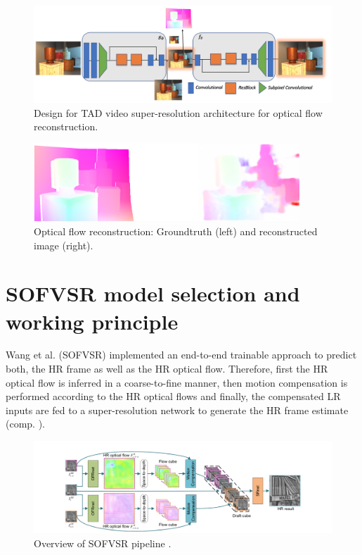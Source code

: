 \begin{figure}[!ht]
	\centering
	\includegraphics[width=14cm]{figures/architecture_video_flow}
	\caption{Design for \ac{TAD} video super-resolution architecture for optical flow reconstruction. }
  \label{fig:architecture_video_flow}
\end{figure}

\begin{figure}[!ht]
	\centering
	\includegraphics[width=10cm]{figures/flow}
	\caption{Optical flow reconstruction: Groundtruth (left) and reconstructed
  image (right).}
  \label{fig:flow}
\end{figure}

\section*{SOFVSR model selection and working principle}
Wang et al. \cite{LFVSRTHROFE} (SOFVSR) implemented an end-to-end trainable approach to predict both, the \ac{HR} frame as well as the HR optical flow. Therefore, first the HR optical flow is inferred in a coarse-to-fine manner, then motion compensation is performed according to the HR optical flows and finally, the compensated LR inputs are fed to a super-resolution network to generate the HR frame estimate (comp. ).

\begin{figure}[!ht]
	\centering
	\includegraphics[width=14cm]{figures/sofvsr}
	\caption{Overview of SOFVSR pipeline \cite{LFVSRTHROFE}.}
  \label{fig:sofvsr}
\end{figure}

